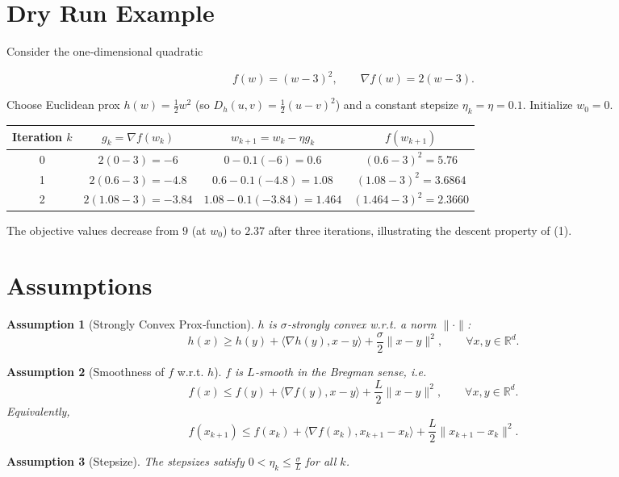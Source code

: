 \documentclass{article}
\newtheorem{assumption}{Assumption}
\newcommand{\Breg}[2]{D_{h}(#1,#2)}
\newcommand{\grad}{\nabla}
\begin{document}
\section*{Dry Run Example}
Consider the one‑dimensional quadratic  

\[
f(w)=(w-3)^2 ,\qquad \grad f(w)=2(w-3).
\]

Choose Euclidean prox $h(w)=\tfrac12 w^{2}$ (so $\Breg{u}{v}=\tfrac12 (u-v)^2$) and a constant stepsize $\eta_k=\eta=0.1$.  
Initialize $w_0=0$.

\begin{center}
\begin{tabular}{c|c|c|c}
Iteration $k$ & $g_k=\grad f(w_k)$ & $w_{k+1}=w_k-\eta g_k$ & $f(w_{k+1})$\\\hline
0 & $2(0-3)=-6$ & $0-0.1(-6)=0.6$ & $(0.6-3)^2=5.76$\\
1 & $2(0.6-3)=-4.8$ & $0.6-0.1(-4.8)=1.08$ & $(1.08-3)^2=3.6864$\\
2 & $2(1.08-3)=-3.84$ & $1.08-0.1(-3.84)=1.464$ & $(1.464-3)^2=2.3660$\\
\end{tabular}
\end{center}
The objective values decrease from $9$ (at $w_0$) to $2.37$ after three iterations, illustrating the descent property of (1).

\newpage
\section*{Assumptions}
\begin{assumption}[Strongly Convex Prox‑function]\label{as:h}
$h$ is $\sigma$‑strongly convex w.r.t. a norm $\|\cdot\|$:
\[
h(x)\ge h(y)+\langle\nabla h(y),x-y\rangle+\frac{\sigma}{2}\|x-y\|^{2},
\qquad\forall x,y\in\mathbb{R}^{d}.
\]
\end{assumption}

\begin{assumption}[Smoothness of $f$ w.r.t. $h$]\label{as:f}
$f$ is $L$‑smooth in the Bregman sense, i.e.
\[
f(x)\le f(y)+\langle\grad f(y),x-y\rangle+\frac{L}{2}\|x-y\|^{2},
\qquad\forall x,y\in\mathbb{R}^{d}.
\]
Equivalently,
\[
f(x_{k+1})\le f(x_k)+\langle\grad f(x_k),x_{k+1}-x_k\rangle
                +\frac{L}{2}\|x_{k+1}-x_k\|^{2}.
\tag{3}
\]
\end{assumption}

\begin{assumption}[Stepsize]\label{as:eta}
The stepsizes satisfy $0<\eta_k\le \frac{\sigma}{L}$ for all $k$.
\end{assumption}
\end{document}
